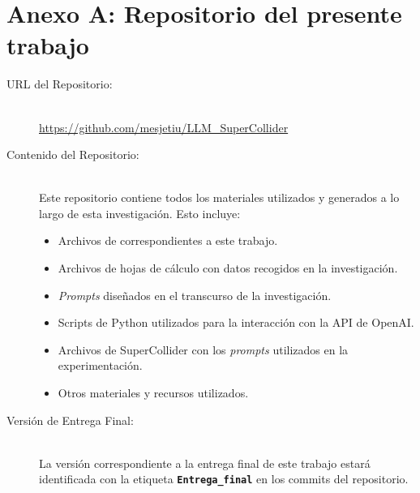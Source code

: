 \chapter*{Anexo A: Repositorio del presente trabajo}
\label{anexo:repositorio}

\begin{center}
\end{center}

\begin{description}
    \item[URL del Repositorio:] \hfill \\
    \url{https://github.com/mesjetiu/LLM_SuperCollider}
    
    \item[Contenido del Repositorio:] \hfill \\
    Este repositorio contiene todos los materiales utilizados y generados a lo largo de esta investigación. Esto incluye:
    \begin{itemize}
        \item Archivos de  correspondientes a este trabajo.
        \item Archivos de hojas de cálculo con datos recogidos en la investigación.
        \item \textit{Prompts} diseñados en el transcurso de la investigación.
        \item Scripts de Python utilizados para la interacción con la API de OpenAI.
        \item Archivos de SuperCollider con los \textit{prompts} utilizados en la experimentación.
        \item Otros materiales y recursos utilizados.
    \end{itemize}
    
    \item[Versión de Entrega Final:] \hfill \\
    La versión correspondiente a la entrega final de este trabajo estará identificada con la etiqueta \textbf{\texttt{Entrega\_final}} en los commits del repositorio.

\end{description}

